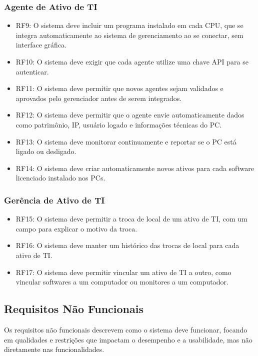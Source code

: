 \subsubsection{Agente de Ativo de TI}
\begin{itemize}
    \item RF9: O sistema deve incluir um programa instalado em cada CPU, que se integra automaticamente ao sistema de gerenciamento ao se conectar, sem interface gráfica.
    \item RF10: O sistema deve exigir que cada agente utilize uma chave API para se autenticar.
    \item RF11: O sistema deve permitir que novos agentes sejam validados e aprovados pelo gerenciador antes de serem integrados.
    \item RF12: O sistema deve permitir que o agente envie automaticamente dados como patrimônio, IP, usuário logado e informações técnicas do PC.
    \item RF13: O sistema deve monitorar continuamente e reportar se o PC está ligado ou desligado.
    \item RF14: O sistema deve criar automaticamente novos ativos para cada software licenciado instalado nos PCs.
\end{itemize}

\subsubsection{Gerência de Ativo de TI}
\begin{itemize}
    \item RF15: O sistema deve permitir a troca de local de um ativo de TI, com um campo para explicar o motivo da troca.
    \item RF16: O sistema deve manter um histórico das trocas de local para cada ativo de TI.
    \item RF17: O sistema deve permitir vincular um ativo de TI a outro, como vincular softwares a um computador ou monitores a um computador.
\end{itemize}


\subsection{Requisitos Não Funcionais}

Os requisitos não funcionais descrevem como o sistema deve funcionar, focando em qualidades e restrições que impactam o desempenho e a usabilidade, mas não diretamente nas funcionalidades.

